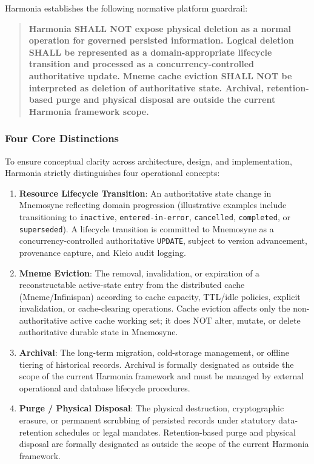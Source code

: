 Harmonia establishes the following normative platform guardrail:

\begin{quote}
    \textbf{Harmonia SHALL NOT expose physical deletion as a normal operation for governed persisted information. Logical deletion SHALL be represented as a domain-appropriate lifecycle transition and processed as a concurrency-controlled authoritative update. Mneme cache eviction SHALL NOT be interpreted as deletion of authoritative state. Archival, retention-based purge and physical disposal are outside the current Harmonia framework scope.}
\end{quote}

\subsubsection{Four Core Distinctions}

To ensure conceptual clarity across architecture, design, and implementation, Harmonia strictly distinguishes four operational concepts:

\begin{enumerate}
    \item \textbf{Resource Lifecycle Transition}: An authoritative state change in Mnemosyne reflecting domain progression (illustrative examples include transitioning to \texttt{inactive}, \texttt{entered-in-error}, \texttt{cancelled}, \texttt{completed}, or \texttt{superseded}). A lifecycle transition is committed to Mnemosyne as a concurrency-controlled authoritative \texttt{UPDATE}, subject to version advancement, provenance capture, and Kleio audit logging.
    \item \textbf{Mneme Eviction}: The removal, invalidation, or expiration of a reconstructable active-state entry from the distributed cache (Mneme/Infinispan) according to cache capacity, TTL/idle policies, explicit invalidation, or cache-clearing operations. Cache eviction affects only the non-authoritative active cache working set; it does NOT alter, mutate, or delete authoritative durable state in Mnemosyne.
    \item \textbf{Archival}: The long-term migration, cold-storage management, or offline tiering of historical records. Archival is formally designated as outside the scope of the current Harmonia framework and must be managed by external operational and database lifecycle procedures.
    \item \textbf{Purge / Physical Disposal}: The physical destruction, cryptographic erasure, or permanent scrubbing of persisted records under statutory data-retention schedules or legal mandates. Retention-based purge and physical disposal are formally designated as outside the scope of the current Harmonia framework.
\end{enumerate}

